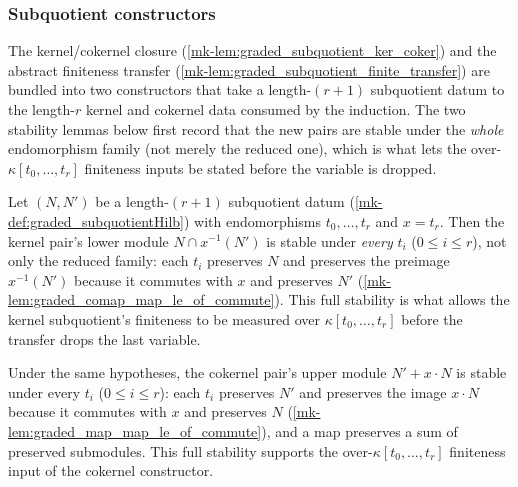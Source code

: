 \subsubsection*{Subquotient constructors}

The kernel/cokernel closure (\ref{mk-lem:graded_subquotient_ker_coker}) and the
abstract finiteness transfer (\ref{mk-lem:graded_subquotient_finite_transfer}) are
bundled into two constructors that take a length-\((r+1)\) subquotient datum to the
length-\(r\) kernel and cokernel data consumed by the induction. The two stability
lemmas below first record that the new pairs are stable under the \emph{whole}
endomorphism family (not merely the reduced one), which is what lets the over-\(\kappa[t_0,\dots,t_r]\)
finiteness inputs be stated before the variable is dropped.

\begin{lemma}\label{mk-lem:graded_ker_stable_full}
  \leanok

  Let \((N, N')\) be a length-\((r+1)\) subquotient datum
  (\ref{mk-def:graded_subquotientHilb}) with endomorphisms \(t_0, \dots, t_r\) and
  \(x = t_r\). Then the kernel pair's lower module \(N \cap x^{-1}(N')\) is stable
  under \emph{every} \(t_i\) (\(0 \le i \le r\)), not only the reduced family: each
  \(t_i\) preserves \(N\) and preserves the preimage \(x^{-1}(N')\) because it
  commutes with \(x\) and preserves \(N'\)
  (\ref{mk-lem:graded_comap_map_le_of_commute}). This full stability is what allows the
  kernel subquotient's finiteness to be measured over \(\kappa[t_0, \dots, t_r]\)
  before the transfer drops the last variable.
\end{lemma}

\begin{lemma}\label{mk-lem:graded_coker_stable_full}
  \leanok

  Under the same hypotheses, the cokernel pair's upper module \(N' + x \cdot N\) is
  stable under every \(t_i\) (\(0 \le i \le r\)): each \(t_i\) preserves \(N'\) and
  preserves the image \(x \cdot N\) because it commutes with \(x\) and preserves
  \(N\) (\ref{mk-lem:graded_map_map_le_of_commute}), and a map preserves a sum of
  preserved submodules. This full stability supports the over-\(\kappa[t_0, \dots,
  t_r]\) finiteness input of the cokernel constructor.
\end{lemma}

